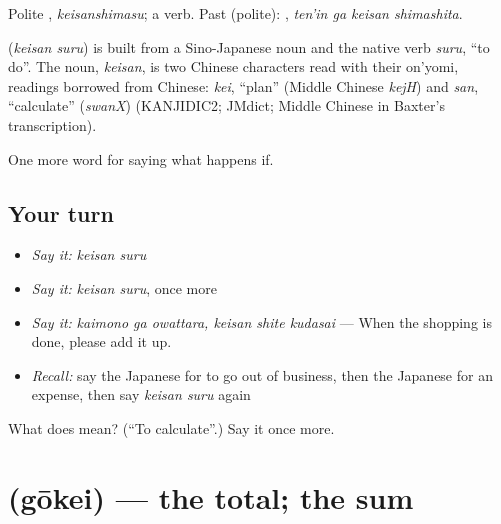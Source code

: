 Polite \textbf{}, \emph{keisanshimasu}; a  verb. Past (polite): \textbf{ }, \emph{ten'in ga keisan shimashita}.

\begin{cousinweb}
\textbf{} (\emph{keisan suru}) is built from a Sino-Japanese noun and the native verb \emph{suru}, \textquotedblleft{}to do\textquotedblright{}. The noun, \emph{keisan}, is two Chinese characters read with their on'yomi, readings borrowed from Chinese: \emph{kei}, \textquotedblleft{}plan\textquotedblright{} (Middle Chinese \emph{kejH}) and \emph{san}, \textquotedblleft{}calculate\textquotedblright{} (\emph{swanX}) (KANJIDIC2; JMdict; Middle Chinese in Baxter's transcription).
\end{cousinweb}

\begin{grammarlens}[title={What you've built}]
One more word for saying what happens if.
\end{grammarlens}

\subsection*{Your turn}
\begin{itemize}
\raggedright
  \item \emph{Say it:} \emph{keisan suru}
  \item \emph{Say it:} \emph{keisan suru}, once more
  \item \emph{Say it:} \emph{kaimono ga owattara, keisan shite kudasai} — When the shopping is done, please add it up.
  \item \emph{Recall:} say the Japanese for to go out of business, then the Japanese for an expense, then say \emph{keisan suru} again
\end{itemize}

\begin{tcolorbox}[breakable,colback=teal!4,colframe=teal!35!black,title={Before you move on}]
What does  mean? (\textquotedblleft{}To calculate\textquotedblright{}.) Say it once more.
\end{tcolorbox}
\section[\texorpdfstring{\ja{ごうけい} (gōkei)}{ごうけい (gōkei)}]{ (gōkei) — the total; the sum}

\label{lesson:JA-C362-goukei}



